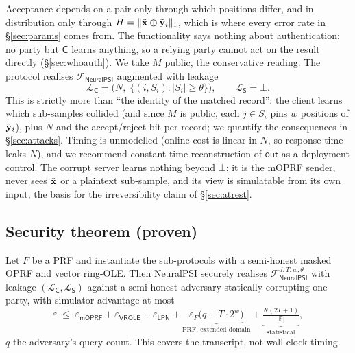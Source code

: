 Acceptance depends on a pair only through which positions differ, and in distribution only through
$H = \|\tilde{\mathbf{x}} \oplus \tilde{\mathbf{y}}_i\|_1$, which is where every error rate in \S\ref{sec:params} comes from. The
functionality says nothing about authentication: no party but $\mathsf{C}$ learns anything, so a
relying party cannot act on the result directly (\S\ref{sec:whoauth}). We take $M$ public, the
conservative reading. \label{sec:leakage}The protocol realises $\mathcal{F}_{\mathsf{NeuralPSI}}$
augmented with leakage
\begin{equation}
\label{eq:leakC}
\mathcal{L}_{\mathsf{C}} = \bigl(N,\; \{(i, S_i) : |S_i| \ge \theta\}\bigr), \qquad
\mathcal{L}_{\mathsf{S}} = \bot .
\end{equation}
This is strictly more than ``the identity of the matched record'': the client learns which sub-samples
collided (and since $M$ is public, each $j \in S_i$ pins $w$ positions of $\tilde{\mathbf{y}}_i$), plus $N$ and the
accept/reject bit per record; we quantify the consequences in \S\ref{sec:attacks}. Timing is unmodelled
(online cost is linear in $N$, so response time leaks $N$), and we recommend constant-time
reconstruction of $\mathsf{out}$ as a deployment control. The corrupt server learns nothing beyond
$\bot$: it is the mOPRF sender, never sees $\tilde{\mathbf{x}}$ or a plaintext sub-sample, and its view is simulatable
from its own input, the basis for the irreversibility claim of \S\ref{sec:atrest}.

\subsection{Security theorem (proven)}

\begin{theorem}
\label{thm:main}
Let $F$ be a PRF and instantiate the sub-protocols with a semi-honest masked OPRF and vector ring-OLE.
Then NeuralPSI securely realises $\mathcal{F}_{\mathsf{NeuralPSI}}^{d,T,w,\theta}$ with leakage
$(\mathcal{L}_{\mathsf{C}}, \mathcal{L}_{\mathsf{S}})$ against a semi-honest adversary statically
corrupting one party, with simulator advantage at most
\begin{equation}
\label{eq:bound}
\varepsilon \;\le\;
   \varepsilon_{\mathsf{mOPRF}} + \varepsilon_{\mathsf{VROLE}} + \varepsilon_{\mathsf{LPN}}
 + \underbrace{\varepsilon_{F}\bigl(q + T\!\cdot\!2^{w}\bigr)}_{\text{PRF, extended domain}}
 + \underbrace{\tfrac{N(2T+1)}{|\mathbb{F}|}}_{\text{statistical}} ,
\end{equation}
$q$ the adversary's query count. This covers the transcript, not wall-clock timing.
\end{theorem}

